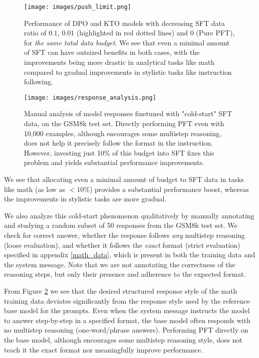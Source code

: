 \begin{figure}[!ht]
    \centering
    \texttt{[image: images/push\_limit.png]}
    \caption{Performance of DPO and KTO models with decreasing SFT data ratio of $0.1$, $0.01$ (highlighted in red dotted lines) and $0$ (Pure PFT), for \textit{the same total data budget}. We see that even a minimal amount of SFT can have outsized benefits in both cases, with the improvements being more drastic in analytical tasks like math compared to gradual improvements in stylistic tasks like instruction following.}
    \label{fig:push_limit}
\end{figure}

\begin{figure}[!ht]
    \centering
    \texttt{[image: images/response\_analysis.png]}
    \caption{Manual analysis of model responses finetuned with "cold-start" SFT data, on the GSM8k test set. Directly performing PFT even with 10,000 examples, although encourages some multistep reasoning, does not help it precisely follow the format in the instruction. However, investing just 10\% of this budget into SFT fixes this problem and yields substantial performance improvements.  }
    \label{fig:response_analysis}
\end{figure}


We see that allocating even a minimal amount of budget to SFT data in tasks like math (as low as $<10\%$) provides a substantial performance boost, whereas the improvements in stylistic tasks are more gradual.

We also analyze this cold-start phenomenon qualitatively by manually annotating and studying a random subset of 50 responses from the GSM8k test set. We check for correct answer, whether the response follows \textit{any} multistep reasoning (loose evaluation), and whether it follows the \textit{exact} format (strict evaluation) specified in appendix \ref{math_data}, which is present in both the training data and the system message. Note that we are not annotating the correctness of the reasoning steps, but only their presence and adherence to the expected format. 

From Figure \ref{fig:response_analysis} we see that the desired structured response style of the math training data deviates significantly from the response style used by the reference base model for the prompts. Even when the system message instructs the model to answer step-by-step in a specified format, the base model often responds with no multistep reasoning (one-word/phrase answers). Performing PFT directly on the base model, although encourages some multistep reasoning style, does not teach it the exact format nor meaningfully improve performance. 

